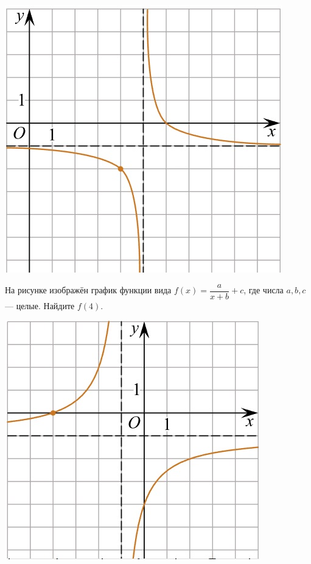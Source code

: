 \begin{class}[number=5]
\begin{listofex}
\begin{minipage}[c]{0.25\textwidth}
			\includegraphics[align=t, width=\textwidth]{pics/G101M4C5-2.jpg}
		\end{minipage}
		\item
		\begin{minipage}[t]{0.67\textwidth}
			На рисунке изображён график функции вида \(f(x)=\dfrac{a}{x+b}+c\), где числа \(a, b, c\) --- целые. Найдите \(f(4)\).
		\end{minipage}
		\begin{minipage}[c]{0.25\textwidth}
			\includegraphics[align=t, width=\textwidth]{pics/G101M4C5-3.jpg}

\end{minipage}
\end{listofex}
\end{class}
